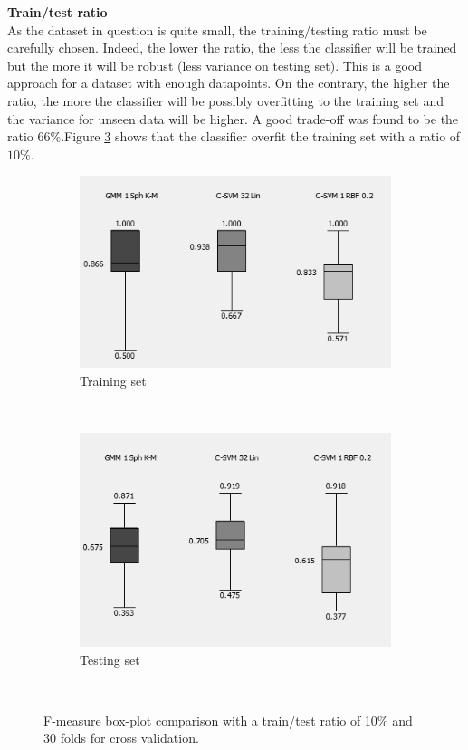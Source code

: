 \documentclass[a4paper,10pt]{article}
\begin{document}
\textbf{Train/test ratio}\\
As the dataset in question is quite small, the training/testing ratio must be carefully chosen. Indeed, the lower the ratio, the less the classifier will be trained but the more it will be robust (less variance on testing set). This is a good approach for a dataset with enough datapoints. On the contrary, the higher the ratio, the more the classifier will be possibly overfitting to the training set and the variance for unseen data will be higher. A good trade-off was found to be the ratio $66\%$.Figure \ref{fig:robustness-train-ratio} shows that the classifier overfit the training set with a ratio of $10\%$.

\begin{figure}[H]
\centering
	\begin{subfigure}[t]{0.3\textwidth} \label{fig:best-GMM}
      \centering
      \includegraphics[height=3.2 cm]{pictures/train-test-ratio-low-10percent-train-data}
      \caption{Training set}
      \label{fig:train-test-ratio-low-10percent-train-data}
    \end{subfigure}%
    ~
    \begin{subfigure}[t]{0.3\textwidth} \label{fig:best-SVM}
      \centering
      \includegraphics[height=3.2 cm]{pictures/train-test-ratio-low-10percent-test-data}
      \caption{Testing set}
      \label{fig:train-test-ratio-low-10percent-train-data}
     \end{subfigure}
      ~
     \caption{F-measure box-plot comparison with a train/test ratio of 10\% and 30 folds for cross validation.}\label{fig:robustness-train-ratio}
\end{figure}
\end{document}
